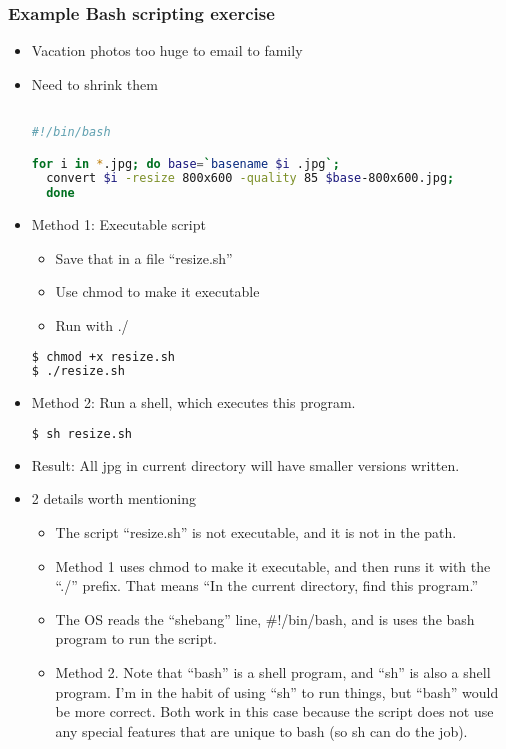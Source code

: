 \documentclass[English]{beamer}
\begin{document}
\begin{frame}
  \frametitle{Example Bash scripting exercise}
  \begin{itemize}
    \item Vacation photos too huge to email to family
    \item Need to shrink them


\begin{lstlisting}[basicstyle={\tiny},breaklines=true,language=bash] 

#!/bin/bash

for i in *.jpg; do base=`basename $i .jpg`; 
  convert $i -resize 800x600 -quality 85 $base-800x600.jpg; 
  done
\end{lstlisting}

\item Method 1: Executable script
  \begin{itemize}
  \item Save that in a file ``resize.sh''
  \item Use chmod to make it executable
  \item Run with ./ 
 \end{itemize}

\begin{lstlisting}[basicstyle={\tiny},breaklines=true,language=bash] 
$ chmod +x resize.sh
$ ./resize.sh
\end{lstlisting}
 
\item Method 2: Run a shell, which executes this program. 

\begin{lstlisting}[basicstyle={\tiny},breaklines=true,language=bash] 
$ sh resize.sh
\end{lstlisting}

\item Result: All jpg in current directory will have smaller versions
  written.
\item 2 details worth mentioning
  \begin{itemize}
  \item The script ``resize.sh'' is not executable, and it is not in
    the path.
  \item Method 1 uses chmod to make it executable, and then runs it
    with the ``./'' prefix.  That means ``In the current directory,
    find this program.''
  \item The OS reads the ``shebang'' line,  \#!/bin/bash, and is uses
    the bash program to run the script. 
  \item Method 2. Note that ``bash'' is a shell program, and ``sh'' is
    also a shell program.  I'm in the habit of using ``sh'' to run
    things, but ``bash'' would be more correct.  Both work in this
    case because the script does not use any special features that are
    unique to bash (so sh can do the job). 
  

\end{itemize}
\end{itemize}
\end{frame}
\end{document}
